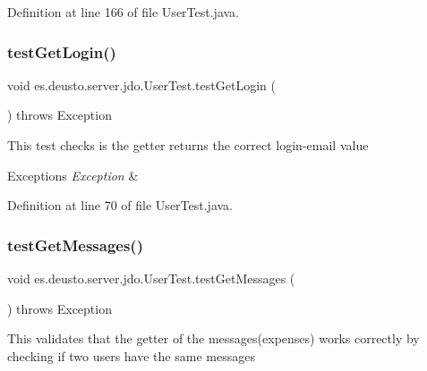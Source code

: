 Definition at line 166 of file User\+Test.\+java.

\mbox{\label{classes_1_1deusto_1_1server_1_1jdo_1_1_user_test_a5620fe8a855002a48cdc5b260491ef8f}} 
\subsubsection{\texorpdfstring{test\+Get\+Login()}{testGetLogin()}}
{\footnotesize\ttfamily void es.\+deusto.\+server.\+jdo.\+User\+Test.\+test\+Get\+Login (\begin{DoxyParamCaption}{ }\end{DoxyParamCaption}) throws Exception}

This test checks is the getter returns the correct login-\/email value 
\begin{DoxyExceptions}{Exceptions}
{\em Exception} & \\
\hline
\end{DoxyExceptions}


Definition at line 70 of file User\+Test.\+java.

\mbox{\label{classes_1_1deusto_1_1server_1_1jdo_1_1_user_test_a73c44236a983959ce39adbd4803c83c1}} 
\subsubsection{\texorpdfstring{test\+Get\+Messages()}{testGetMessages()}}
{\footnotesize\ttfamily void es.\+deusto.\+server.\+jdo.\+User\+Test.\+test\+Get\+Messages (\begin{DoxyParamCaption}{ }\end{DoxyParamCaption}) throws Exception}

This validates that the getter of the messages(expenses) works correctly by checking if two users have the same messages~\newline

